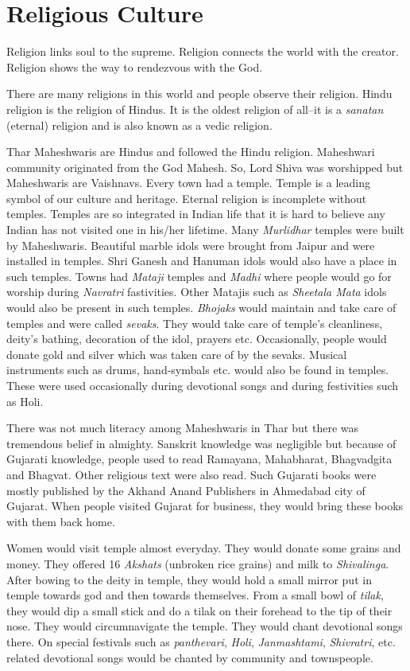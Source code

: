\chapter{Religious Culture}
Religion links soul to the supreme. Religion connects the world with the
creator. Religion shows the way to rendezvous with the God.

There are many religions in this world and people observe their religion. Hindu
religion is the religion of Hindus. It is the oldest religion of all--it is a
\textit{sanatan} (eternal) religion and is also known as a vedic religion.

Thar Maheshwaris are Hindus and followed the Hindu religion. Maheshwari
community originated from the God Mahesh. So, Lord Shiva was worshipped but
Maheshwaris are Vaishnavs. Every town had a temple. Temple is a leading symbol
of our culture and heritage. Eternal religion is incomplete without temples.
Temples are so integrated in Indian life that it is hard to believe any Indian
has not visited one in his/her lifetime. Many \textit{Murlidhar} temples were
built by Maheshwaris. Beautiful marble idols were brought from Jaipur and were
installed in temples. Shri Ganesh and Hanuman idols would also have a place in
such temples. Towns had \textit{Mataji} temples and \textit{Madhi} where people
would go for worship during \textit{Navratri} fastivities. Other Matajis such
as \textit{Sheetala Mata} idols would also be present in such temples.
\textit{Bhojaks} would maintain and take care of temples and were called
\textit{sevaks}. They would take care of temple's cleanliness, deity's bathing,
decoration of the idol, prayers etc. Occasionally, people would donate gold and
silver which was taken care of by the sevaks. Musical instruments such as
drums, hand-symbals etc. would also be found in temples. These were used
occasionally during devotional songs and during festivities such as Holi.

There was not much literacy among Maheshwaris in Thar but there was tremendous
belief in almighty. Sanskrit knowledge was negligible but because of Gujarati
knowledge, people used to read Ramayana, Mahabharat, Bhagvadgita and Bhagvat.
Other religious text were also read. Such Gujarati books were mostly published
by the Akhand Anand Publishers in Ahmedabad city of Gujarat. When people
visited Gujarat for business, they would bring these books with them back home.

Women would visit temple almost everyday. They would donate some grains and
money. They offered 16 \textit{Akshats} (unbroken rice grains) and milk to
\textit{Shivalinga}. After bowing to the deity in temple, they would hold a small
mirror put in temple towards god and then towards themselves. From a small bowl
of \textit{tilak}, they would dip a small stick and do a tilak on their
forehead to the tip of their nose. They would circumnavigate the temple. They
would chant devotional songs there. On special festivals such as
\textit{panthevari}, \textit{Holi}, \textit{Janmashtami}, \textit{Shivratri},
etc. related devotional songs would be chanted by community and townspeople.

